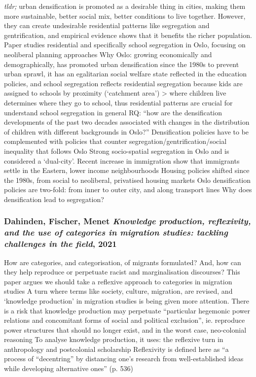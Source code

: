 \documentclass{article}
\begin{document}
\begin{outline}
	\1 \textit{tldr;} urban densification is promoted as a desirable thing in cities, making them more sustainable, better social mix, better conditions to live together. However, they can create undesirable residential patterns like segregation and gentrification, and empirical evidence shows that it benefits the richer population. Paper studies residential and specifically school segregation in Oslo, focusing on neoliberal planning approaches
	\1 Why Oslo: growing economically and demographically, has promoted urban densification since the 1980s to prevent urban sprawl, it has an egalitarian social welfare state reflected in the education policies, and school segregation reflects residential segregation because kids are assigned to schools by proximity (`catchment area') > where children live determines where they go to school, thus residential patterns are crucial for understand school segregation in general
	\1 RQ: ``how are the densification developments of the past two decades associated with changes in the distribution of children with different backgrounds in Oslo?''
	\1 Densification policies have to be complemented with policies that counter segregation/gentrification/social inequality that follows
	\1 Oslo
		\2 Strong socio-spatial segregation in Oslo and is considered a `dual-city'. Recent increase in immigration show that immigrants settle in the Eastern, lower income neighbourhoods
		\2 Housing policies shifted since the 1980s, from social to neoliberal, privatised housing markets
		\2 Oslo densification policies are two-fold: from inner to outer city, and along transport lines
	\1 Why does densification lead to segregation?
		\2 
\end{outline}

\subsubsection{Dahinden, Fischer, Menet \textit{Knowledge production, reflexivity, and the use of categories in migration studies: tackling challenges in the field}, 2021}

\begin{outline}
	\1 How are categories, and categorisation, of migrants formulated? And, how can they help reproduce or perpetuate racist and marginalisation discourses? This paper argues we should take a reflexive approach to categories in migration studies
	\1 A turn where terms like society, culture, migration, are revised, and `knowledge production' in migration studies is being given more attention. There is a risk that knowledge production may perpetuate ``particular hegemonic power relations and concomitant forms of social and political exclusion'', ie. reproduce power structures that should no longer exist, and in the worst case, neo-colonial reasoning
	\1 To analyse knowledge production, it uses: the reflexive turn in anthropology and postcolonial scholarship
	\1 Reflexivity is defined here as ``a process of ``decentring'' by distancing one's research from well-established ideas while developing alternative ones'' (p. 536)
		\2 
\end{outline}
\end{document}
